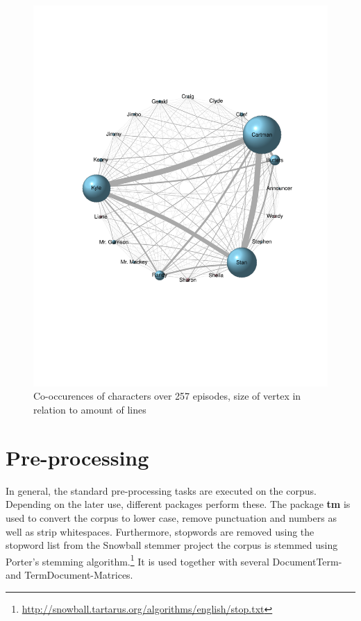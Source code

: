 \documentclass[10pt,a4paper]{article}
\begin{document}
	\begin{figure}[h]
	\centering
	\includegraphics[scale=0.7]{images/CoOccurence Matrix.pdf}
	\caption{Co-occurences of characters over 257 episodes, size of vertex in relation to amount of lines}
	\label{fig:CoOccurence}
	\end{figure}
	
	
	\section{Pre-processing}
	In general, the standard pre-processing tasks are executed on the corpus. Depending on the later use, different packages perform these.
	The package \textbf{tm} is used to convert the corpus to lower case, remove punctuation and numbers as well as strip whitespaces. Furthermore, stopwords are removed using the stopword list from the Snowball stemmer project  the corpus is stemmed using Porter's stemming algorithm.\footnote{\url{http://snowball.tartarus.org/algorithms/english/stop.txt}} It is used together with several DocumentTerm- and TermDocument-Matrices.
	
\end{document}

